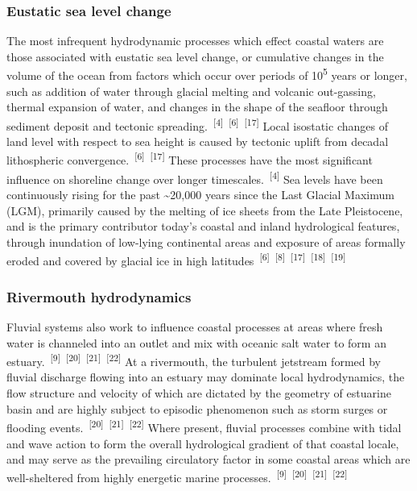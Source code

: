 \documentclass{article}
\begin{document}
\subsubsection{Eustatic sea level change}

\par{The most infrequent hydrodynamic processes which effect coastal waters are those associated with eustatic sea level change, or cumulative changes in the volume of the ocean from factors which occur over periods of 10\textsuperscript{5} years or longer, such as addition of water through glacial melting and volcanic out-gassing, thermal expansion of water, and changes in the shape of the seafloor through sediment deposit and tectonic spreading.~\textsuperscript{[4]}~\textsuperscript{[6]}~\textsuperscript{[17]} Local isostatic changes of land level with respect to sea height is caused by tectonic uplift from decadal lithospheric convergence.~\textsuperscript{[6]}~\textsuperscript{[17]} These processes have the most significant influence on shoreline change over longer timescales.~\textsuperscript{[4]} Sea levels have been continuously rising for the past \textasciitilde20,000 years since the Last Glacial Maximum (LGM), primarily caused by the melting of ice sheets from the Late Pleistocene, and is the primary contributor today's coastal and inland hydrological features, through inundation of low-lying continental areas and exposure of areas formally eroded and covered by glacial ice in high latitudes~\textsuperscript{[6]}~\textsuperscript{[8]}~\textsuperscript{[17]}~\textsuperscript{[18]}~\textsuperscript{[19]}}


\subsubsection{Rivermouth hydrodynamics}

\par{Fluvial systems also work to influence coastal processes at areas where fresh water is channeled into an outlet and mix with oceanic salt water to form an estuary.~\textsuperscript{[9]}~\textsuperscript{[20]}~\textsuperscript{[21]}~\textsuperscript{[22]} At a rivermouth, the turbulent jetstream formed by fluvial discharge flowing into an estuary may dominate local hydrodynamics, the flow structure and velocity of which are dictated by the geometry of estuarine basin and are highly subject to episodic phenomenon such as storm surges or flooding events.~\textsuperscript{[20]}~\textsuperscript{[21]}~\textsuperscript{[22]} Where present, fluvial processes combine with tidal and wave action to form the overall hydrological gradient of that coastal locale, and may serve as the prevailing circulatory factor in some coastal areas which are well-sheltered from highly energetic marine processes.~\textsuperscript{[9]}~\textsuperscript{[20]}~\textsuperscript{[21]}~\textsuperscript{[22]}}
\end{document}
